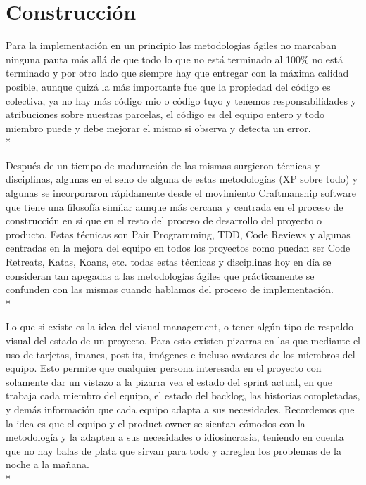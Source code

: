 \documentclass[../pfc.tex]{subfiles}
\begin{document}
	
	\section{Construcción}
	
	Para la implementación en un principio las metodologías ágiles no marcaban ninguna pauta más allá de que todo lo que no está terminado al 100\% no está terminado y por otro lado que siempre hay que entregar con la máxima calidad posible, aunque quizá la más importante fue que la propiedad del código es colectiva, ya no hay más código mio o código tuyo y tenemos responsabilidades y atribuciones sobre nuestras parcelas, el código es del equipo entero y todo miembro puede y debe mejorar el mismo si observa y detecta un error.\\*
	
	Después de un tiempo de maduración de las mismas surgieron técnicas y disciplinas, algunas en el seno de alguna de estas metodologías (XP sobre todo) y algunas se incorporaron rápidamente desde el movimiento Craftmanship software \cite{manifestocraft} que tiene una filosofía similar aunque más cercana y centrada en el proceso de construcción en sí que en el resto del proceso de desarrollo del proyecto o producto. Estas técnicas son Pair Programming, TDD, Code Reviews y algunas centradas en la mejora del equipo en todos los proyectos como puedan ser Code Retreats, Katas, Koans, etc. todas estas técnicas y disciplinas hoy en día se consideran tan apegadas a las metodologías ágiles que prácticamente se confunden con las mismas cuando hablamos del proceso de implementación.\\*
	
	Lo que si existe es la idea del visual management, o tener algún tipo de respaldo visual del estado de un proyecto. Para esto existen pizarras en las que mediante el uso de tarjetas, imanes, post its, imágenes e incluso avatares de los miembros del equipo. Esto permite que cualquier persona interesada en el proyecto con solamente dar un vistazo a la pizarra vea el estado del sprint actual, en que trabaja cada miembro del equipo, el estado del backlog, las historias completadas, y demás información que cada equipo adapta a sus necesidades. Recordemos que la idea es que el equipo y el product owner se sientan cómodos con la metodología y la adapten a sus necesidades o idiosincrasia, teniendo en cuenta que no hay balas de plata que sirvan para todo y arreglen los problemas de la noche a la mañana.\\* 
	
\end{document}
